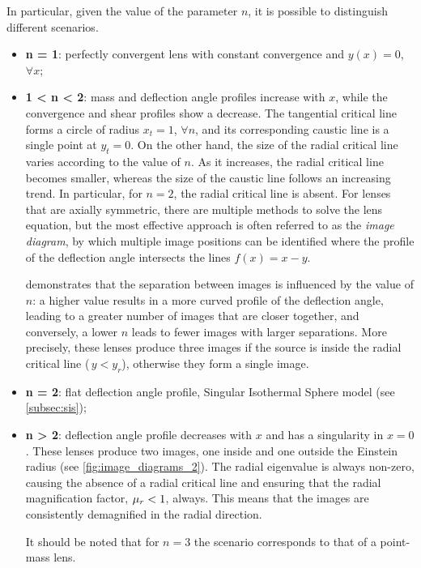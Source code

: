 In particular, given the value of the parameter $n$, it is possible to distinguish different scenarios.
\begin{itemize}
    \item \textbf{n = 1}: perfectly convergent lens with constant convergence and $y (x) = 0$, $\forall x$;
    
    \item \textbf{1 < n < 2}: mass and deflection angle profiles increase with $x$, while the convergence and shear profiles show a decrease. The tangential critical line forms a circle of radius $x_t = 1$, $\forall n$, and its corresponding caustic line is a single point at $y_t = 0$. On the other hand, the size of the radial critical line varies according to the value of $n$. As it increases, the radial critical line becomes smaller, whereas the size of the caustic line follows an increasing trend. In particular, for $n = 2$, the radial critical line is absent. For lenses that are axially symmetric, there are multiple methods to solve the lens equation, but the most effective approach is often referred to as the \emph{image diagram}, by which multiple image positions can be identified where the profile of the deflection angle intersects the lines $f(x) = x - y$.
    
     demonstrates that the separation between images is influenced by the value of $n$: a higher value results in a more curved profile of the deflection angle, leading to a greater number of images that are closer together, and conversely, a lower $n$ leads to fewer images with larger separations. More precisely, these lenses produce three images if the source is inside the radial critical line (\ie $\,y < y_r$), otherwise they form a single image.
    
    \item \textbf{n = 2}: flat deflection angle profile, Singular Isothermal Sphere model (see \cref{subsec:sis});
    
    \item \textbf{n > 2}: deflection angle profile decreases with $x$ and has a singularity in $x = 0$. These lenses produce two images, one inside and one outside the Einstein radius (see \cref{fig:image_diagrams_2}). The radial eigenvalue is always non-zero, causing the absence of a radial critical line and ensuring that the radial magnification factor, $\mu_r < 1$, always. This means that the images are consistently demagnified in the radial direction.
    
    It should be noted that for $n = 3$ the scenario corresponds to that of a point-mass lens.
\end{itemize}

